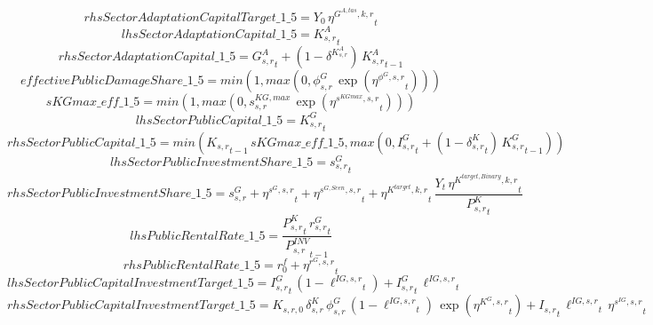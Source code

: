 \begin{dmath*}
rhsSectorAdaptationCapitalTarget\_1\_5 = {{Y_0}}\, {{\eta^{G^{A,tas},k,r}}}_{t}
\end{dmath*}
\begin{dmath*}
lhsSectorAdaptationCapital\_1\_5 = {{K^{A}_{s,r}}}_{t}
\end{dmath*}
\begin{dmath*}
rhsSectorAdaptationCapital\_1\_5 = {{G^{A}_{s,r}}}_{t}+\left(1-{{\delta^{K^{A}_{s,r}}}}\right)\, {{K^{A}_{s,r}}}_{t-1}
\end{dmath*}
\begin{dmath*}
effectivePublicDamageShare\_1\_5 = min(1,max(0,{{\phi^{G}_{s,r}}}\, \exp\left({{\eta^{\phi^{G},s,r}}}_{t}\right)))
\end{dmath*}
\begin{dmath*}
sKGmax\_eff\_1\_5 = min(1,max(0,{{s^{KG,max}_{s,r}}}\, \exp\left({{\eta^{s^{KGmax},s,r}}}_{t}\right)))
\end{dmath*}
\begin{dmath*}
lhsSectorPublicCapital\_1\_5 = {{K^G_{s,r}}}_{t}
\end{dmath*}
\begin{dmath*}
rhsSectorPublicCapital\_1\_5 = min({{K_{s,r}}}_{t-1}\, {sKGmax\_eff\_1\_5},max(0,{{I^G_{s,r}}}_{t}+\left(1-{{\delta^{K}_{s,r}}}_{t}\right)\, {{K^G_{s,r}}}_{t-1}))
\end{dmath*}
\begin{dmath*}
lhsSectorPublicInvestmentShare\_1\_5 = {{s^G_{s,r}}}_{t}
\end{dmath*}
\begin{dmath*}
rhsSectorPublicInvestmentShare\_1\_5 = {{s^{G}_{s,r}}}+{{\eta^{s^G,s,r}}}_{t}+{{\eta^{s^{G,Scen},s,r}}}_{t}+{{\eta^{K^{target},k,r}}}_{t}\, \frac{{Y}_{t}\, {{\eta^{K^{target,Binary},k,r}}}_{t}}{{{P^K_{s,r}}}_{t}}
\end{dmath*}
\begin{dmath*}
lhsPublicRentalRate\_1\_5 = \frac{{{P^K_{s,r}}}_{t}\, {{r^G_{s,r}}}_{t}}{{{P^{INV}_{s,r}}}_{t-1}}
\end{dmath*}
\begin{dmath*}
rhsPublicRentalRate\_1\_5 = {{r^f_0}}+{{\eta^{r^G,s,r}}}_{t}
\end{dmath*}
\begin{dmath*}
lhsSectorPublicCapitalInvestmentTarget\_1\_5 = {{I^G_{s,r}}}_{t}\, \left(1-{{\ell^{IG,s,r}}}_{t}\right)+{{I^G_{s,r}}}_{t}\, {{\ell^{IG,s,r}}}_{t}
\end{dmath*}
\begin{dmath*}
rhsSectorPublicCapitalInvestmentTarget\_1\_5 = {{K_{s,r,0}}}\, {{\delta^{K}_{s,r}}}\, {{\phi^{G}_{s,r}}}\, \left(1-{{\ell^{IG,s,r}}}_{t}\right)\, \exp\left({{\eta^{K^G,s,r}}}_{t}\right)+{{I_{s,r}}}_{t}\, {{\ell^{IG,s,r}}}_{t}\, {{\eta^{s^{IG},s,r}}}_{t}
\end{dmath*}
